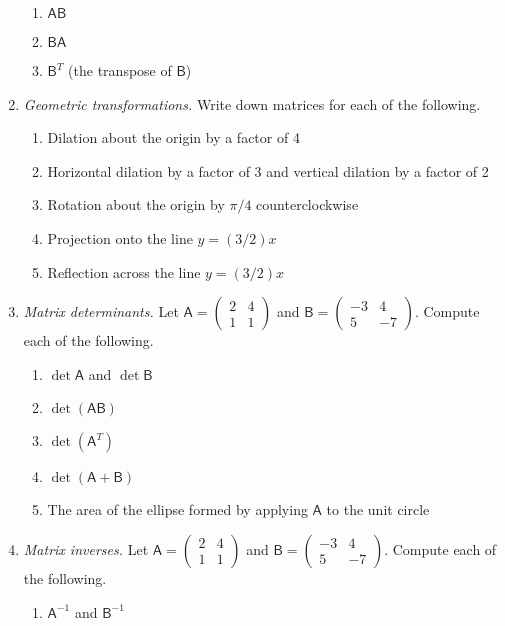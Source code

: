 \begin{enumerate}
\begin{enumerate}
\item $\mathsf{AB}$
\item $\mathsf{BA}$
\item $\mathsf{B}^T$ (the transpose of $\mathsf{B}$)
\end{enumerate}
\item \emph{Geometric transformations.} Write down matrices for each of the following.
\begin{enumerate}
\item Dilation about the origin by a factor of 4
\item Horizontal dilation by a factor of 3 and vertical dilation by a factor of 2
\item Rotation about the origin by $\pi/4$ counterclockwise
\item Projection onto the line $y = (3/2)x$
\item Reflection across the line $y = (3/2)x$
\end{enumerate}
\item \emph{Matrix determinants.} Let $\mathsf{A} = \begin{pmatrix} 2 & 4 \\ 1 & 1 \end{pmatrix}$ and $\mathsf{B} = \begin{pmatrix} -3 & 4 \\ 5 & -7 \end{pmatrix}$. Compute each of the following.
\begin{enumerate}
\item $\det\mathsf{A}$ and $\det\mathsf{B}$
\item $\det(\mathsf{AB})$
\item $\det(\mathsf{A}^T)$
\item $\det(\mathsf{A} + \mathsf{B})$
\item The area of the ellipse formed by applying $\mathsf{A}$ to the unit circle
\end{enumerate}
\item \emph{Matrix inverses.} Let $\mathsf{A} = \begin{pmatrix} 2 & 4 \\ 1 & 1 \end{pmatrix}$ and $\mathsf{B} = \begin{pmatrix} -3 & 4 \\ 5 & -7 \end{pmatrix}$. Compute each of the following.
\begin{enumerate}
\item $\mathsf{A}^{-1}$ and $\mathsf{B}^{-1}$

\end{enumerate}
\end{enumerate}
